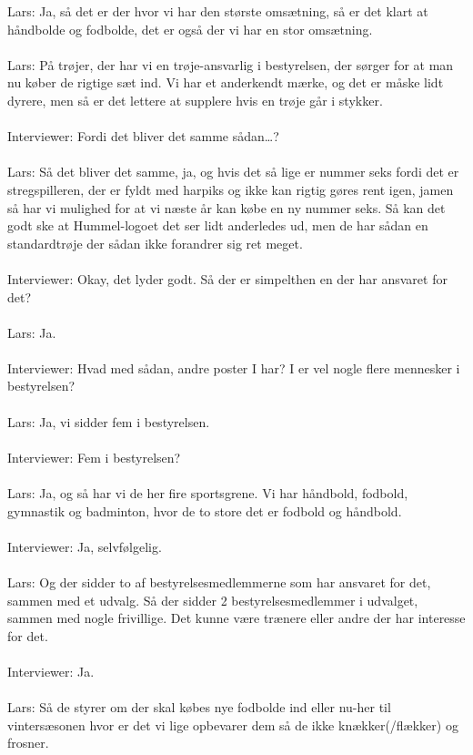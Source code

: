 Lars: Ja, så det er der hvor vi har den største omsætning, så er det klart at håndbolde og fodbolde, det er også der vi har en stor omsætning.
\\\\
Lars: På trøjer, der har vi en trøje-ansvarlig i bestyrelsen, der sørger for at man nu køber de rigtige sæt ind. Vi har et anderkendt mærke, og det er måske lidt dyrere, men så er det lettere at supplere hvis en trøje går i stykker.
\\\\
Interviewer: Fordi det bliver det samme sådan…?
\\\\
Lars: Så det bliver det samme, ja, og hvis det så lige er nummer seks fordi det er stregspilleren, der er fyldt med harpiks og ikke kan rigtig gøres rent igen, jamen så har vi mulighed for at vi næste år kan købe en ny nummer seks. Så kan det godt ske at Hummel-logoet det ser lidt anderledes ud, men de har sådan en standardtrøje der sådan ikke forandrer sig ret meget.
\\\\
Interviewer: Okay, det lyder godt. Så der er simpelthen en der har ansvaret for det?
\\\\
Lars: Ja.
\\\\
Interviewer: Hvad med sådan, andre poster I har? I er vel nogle flere mennesker i bestyrelsen?
\\\\
Lars: Ja, vi sidder fem i bestyrelsen.
\\\\
Interviewer: Fem i bestyrelsen?
\\\\
Lars: Ja, og så har vi de her fire sportsgrene. Vi har håndbold, fodbold, gymnastik og badminton, hvor de to store det er fodbold og håndbold.
\\\\
Interviewer: Ja, selvfølgelig.
\\\\
Lars: Og der sidder to af bestyrelsesmedlemmerne som har ansvaret for det, sammen med et udvalg. Så der sidder 2 bestyrelsesmedlemmer i udvalget, sammen med nogle frivillige. Det kunne være trænere eller andre der har interesse for det.
\\\\
Interviewer: Ja.
\\\\
Lars: Så de styrer om der skal købes nye fodbolde ind eller nu-her til vintersæsonen hvor er det vi lige opbevarer dem så de ikke knækker(/flækker) og frosner.  
